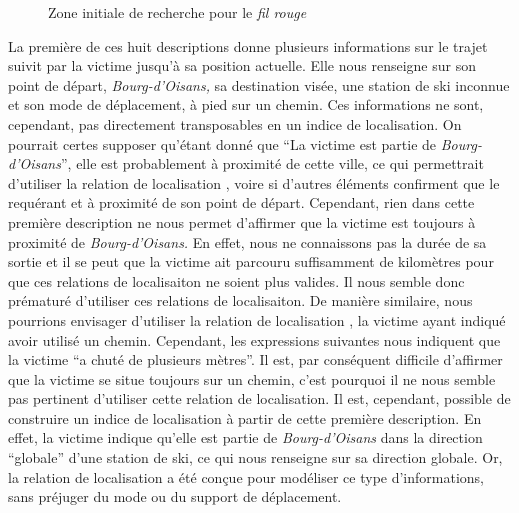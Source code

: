 \begin{figure}
  \centering
  
  \caption{Zone initiale de recherche pour le \emph{fil rouge}}
  \label{fig:zir_fil_rouge}
\end{figure}

La première de ces huit descriptions donne plusieurs informations sur
le trajet suivit par la victime jusqu'à sa position actuelle. Elle
nous renseigne sur son point de départ, \emph{Bourg-d'Oisans,} sa
destination visée, une station de ski inconnue et son mode de
déplacement, à pied sur un chemin. Ces informations ne sont,
cependant, pas directement transposables en un indice de
localisation. On pourrait certes supposer qu'étant donné que
\enquote{La victime est partie de \emph{Bourg-d'Oisans}}, elle est
probablement à proximité de cette ville, ce qui permettrait d'utiliser
la relation de localisation , voire
 si d'autres éléments confirment que le requérant
et à proximité de son point de départ. Cependant, rien dans cette
première description ne nous permet d'affirmer que la victime est
toujours à proximité de \emph{Bourg-d'Oisans.} En effet, nous ne
connaissons pas la durée de sa sortie et il se peut que la victime ait
parcouru suffisamment de kilomètres pour que ces relations de
localisaiton ne soient plus valides. Il nous semble donc prématuré
d'utiliser ces relations de localisaiton. De manière similaire, nous
pourrions envisager d'utiliser la relation de localisation
, la victime
ayant indiqué avoir utilisé un chemin. Cependant, les expressions
suivantes nous indiquent que la victime \enquote{a chuté de plusieurs
  mètres}. Il est, par conséquent difficile d'affirmer que la victime
se situe toujours sur un chemin, c'est pourquoi il ne nous semble pas
pertinent d'utiliser cette relation de localisation. Il est,
cependant, possible de construire un indice de localisation à partir
de cette première description. En effet, la victime indique qu'elle
est partie de \emph{Bourg-d'Oisans} dans la direction
\enquote{globale} d'une station de ski, ce qui nous renseigne sur sa
direction globale. Or, la relation de localisation
 a été conçue pour
modéliser ce type d'informations, sans préjuger du mode ou du support
de déplacement.

